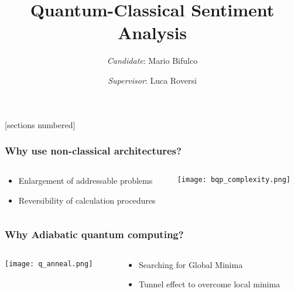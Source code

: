 \documentclass[aspectratio=169]{beamer}
\title{Quantum-Classical Sentiment Analysis}
\author{\emph{Candidate}: Mario Bifulco}
\date{\emph{Supervisor}: Luca Roversi}
\institute{University of Turin}
\begin{document}
[sections numbered]

\begin{frame}
    \titlepage
\end{frame}

\begin{frame}\frametitle{Why use non-classical architectures?}

    \begin{columns}
        \begin{column}{0.4\textwidth}
            \begin{itemize}
                \item Enlargement of addressable problems
                \item Reversibility of calculation procedures
            \end{itemize}
        \end{column}
        \begin{column}{0.6\textwidth}
            \begin{flushright}
                \texttt{[image: bqp\_complexity.png]}
            \end{flushright}
        \end{column}
    \end{columns}

\end{frame}

\begin{frame}\frametitle{Why Adiabatic quantum computing?}

    \begin{columns}
        \begin{column}{0.6\textwidth}
            \begin{flushleft}
                \texttt{[image: q\_anneal.png]}
            \end{flushleft}
        \end{column}
        \begin{column}{0.4\textwidth}
            \begin{itemize}
                \item Searching for Global Minima
                \item Tunnel effect to overcome local minima
            \end{itemize}
        \end{column}
    \end{columns}

\end{frame}
\end{document}
